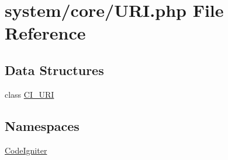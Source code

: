 \hypertarget{_u_r_i_8php}{\section{system/core/\-U\-R\-I.php File Reference}
\label{_u_r_i_8php}
}
\subsection*{Data Structures}
\begin{DoxyCompactItemize}
\item 
class \hyperlink{class_c_i___u_r_i}{C\-I\-\_\-\-U\-R\-I}
\end{DoxyCompactItemize}
\subsection*{Namespaces}
\begin{DoxyCompactItemize}
\item 
\hyperlink{namespace_code_igniter}{Code\-Igniter}
\end{DoxyCompactItemize}
